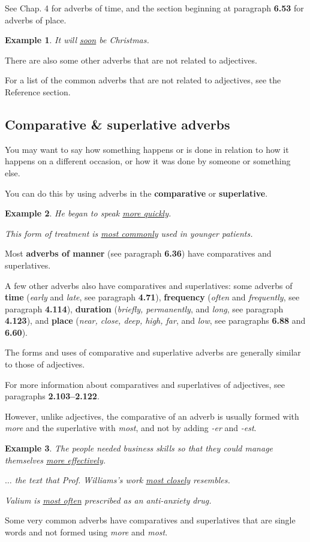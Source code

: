 \documentclass[oneside]{book}
\numberwithin{equation}{section}
\newtheorem{example}{Example}[section]
\begin{document}
See Chap. 4 for adverbs of time, and the section beginning at paragraph \textbf{6.53} for adverbs of place.
\begin{example}
    It will \underline{soon} be Christmas.
\end{example}
There are also some other adverbs that are not related to adjectives.

%
For a list of the common adverbs that are not related to adjectives, see the Reference section.

\subsection{Comparative \& superlative adverbs}
\noindent{} You may want to say how something happens or is done in relation to how it happens on a different occasion, or how it was done by someone or something else.

You can do this by using adverbs in the \textbf{comparative} or \textbf{superlative}.
\begin{example}
    He began to speak \underline{more quickly}.
    
    This form of treatment is \underline{most commonly} used in younger patients.
\end{example}
Most \textbf{adverbs of manner} (see paragraph \textbf{6.36}) have comparatives and superlatives.

%
A few other adverbs also have comparatives and superlatives: some adverbs of \textbf{time} (\textit{early} and \textit{late}, see paragraph \textbf{4.71}), \textbf{frequency} (\textit{often} and \textit{frequently}, see paragraph \textbf{4.114}), \textbf{duration} (\textit{briefly, permanently}, and \textit{long}, see paragraph \textbf{4.123}), and \textbf{place} (\textit{near, close, deep, high, far}, and \textit{low}, see paragraphs \textbf{6.88} and \textbf{6.60}).

%
\noindent{} The forms and uses of comparative and superlative adverbs are generally similar to those of adjectives.

For more information about comparatives and superlatives of adjectives, see paragraphs \textbf{2.103--2.122}.

%
However, unlike adjectives, the comparative of an adverb is usually formed with \textit{more} and the superlative with \textit{most}, and not by adding \textit{-er} and \textit{-est}.
\begin{example}
    The people needed business skills so that they could manage themselves \underline{more effectively}.
    
    $\ldots$ the text that Prof. Williams's work \underline{most closely} resembles.
    
    Valium is \underline{most often} prescribed as an anti-anxiety drug.
\end{example}
%
\noindent{} Some very common adverbs have comparatives and superlatives that are single words and not formed using \textit{more} and \textit{most}.
\end{document}
